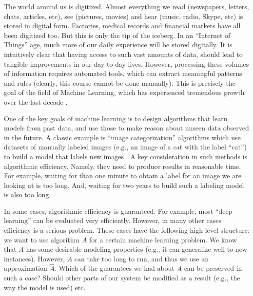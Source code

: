 The world around us is digitized.
Almost everything we read (newspapers, letters, chats, articles, etc), see (pictures, movies) and hear (music, radio, Skype, etc) is stored in digital form.
Factories, medical records and financial markets have all been digitized too.
But this is only the tip of the iceberg. In an ``Internet of Things'' age, much more of our daily experience will be stored digitally.  
It is intuitively clear that having access to such vast amounts of data, should lead to tangible improvements in our day to day lives. However, processing these volumes of information requires automated tools, which can extract meaningful patterns and rules (clearly, this course cannot be done manually). This is precisely the goal of the field of Machine Learning, which has experienced tremendous growth over the last decade  \cite{Bishop:2006}.


One of the key goals of machine learning is to design algorithms that learn models from past data, and use those to make reason about unseen data observed in the future. A classic example is ``image categorization'' algorithms which use datasets of manually labeled images (e.g., an image of a cat with the label ``cat'') to build a model that labels new images \cite{krizhevsky2012imagenet}. A key consideration in such methods is algorithmic efficiency. Namely, they need to produce results in reasonable time. For example, waiting for  than one minute to obtain a label for an image we are looking at is too long. And, waiting for two years to build such a labeling model is also too long. 

In some cases, algorithmic efficiency is guaranteed. For example, most ``deep-learning'' can be evaluated very efficiently. However, in many other cases efficiency is a serious problem. These cases have the following high level structure: we want to use algorithm $A$ for a certain machine learning problem. We know that $A$ has some desirable modeling properties (e.g., it can generalize well to new instances). However, $A$ can take too long to run, and thus we use an approximation $\hat{A}$. Which of the guarantees we had about $A$ can be preserved in such a case? Should other parts of our system be modified as a result (e.g., the way the model is used) etc. 

